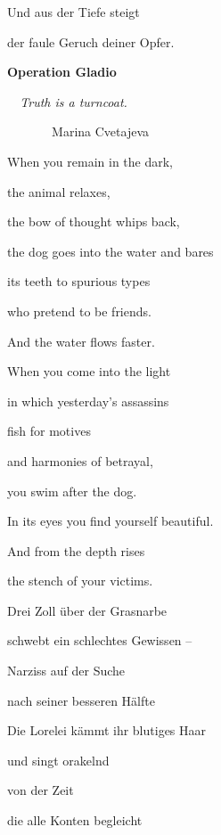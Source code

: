 \documentclass[a4paper]{article}
\begin{document}
\bigskip

Und aus der Tiefe steigt 

der faule Geruch deiner Opfer.

\clearpage
\bigskip

{\bfseries
Operation Gladio}


\bigskip

{\itshape
\ \ Truth is a turncoat.}

\textit{\ \  \ \ \ \ \ }Marina Cvetajeva


\bigskip

When you remain in the dark,

the animal relaxes,

the bow of thought whips back,

the dog goes into the water and bares

its teeth to spurious types

who pretend to be friends.


\bigskip

And the water flows faster.


\bigskip


\bigskip

When you come into the light

in which yesterday’s assassins

fish for motives

and harmonies of betrayal,

you swim after the dog.

In its eyes you find yourself beautiful.


\bigskip

And from the depth rises

the stench of your victims.


\bigskip



\bigskip

Drei Zoll über der Grasnarbe

schwebt ein schlechtes Gewissen – 

Narziss auf der Suche

nach seiner besseren Hälfte


\bigskip

Die Lorelei kämmt ihr blutiges Haar

und singt orakelnd 

von der Zeit

die alle Konten begleicht


\bigskip
\end{document}
